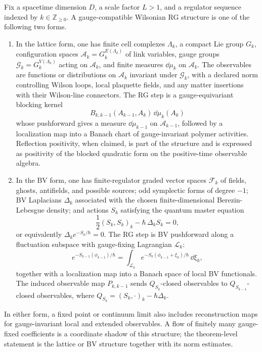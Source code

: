 \begin{definition}
\label{def:gauge-compatible-wilsonian-rg-structure}
Fix a spacetime dimension \(D\), a scale factor \(L>1\), and a regulator
sequence indexed by \(k\in\mathbb Z_{\geq0}\).  A gauge-compatible Wilsonian
RG structure is one of the following two forms.
\begin{enumerate}
  \item In the lattice form, one has finite cell complexes
  \(\Lambda_k\), a compact Lie group \(G_k\), configuration spaces
  \(\mathcal A_k=G_k^{E(\Lambda_k)}\) of link variables, gauge groups
  \(\mathcal G_k=G_k^{V(\Lambda_k)}\) acting on \(\mathcal A_k\), and finite
  measures \(\dd\mu_k\) on \(\mathcal A_k\).  The observables are functions or
  distributions on \(\mathcal A_k\) invariant under \(\mathcal G_k\), with a
  declared norm controlling Wilson loops, local plaquette fields, and any
  matter insertions with their Wilson-line connectors.  The RG step is a
  gauge-equivariant blocking kernel
  \[
    B_{k,k-1}(A_{k-1},A_k)\,\dd\mu_k(A_k)
  \]
  whose pushforward gives a measure \(\dd\mu_{k-1}\) on
  \(\mathcal A_{k-1}\), followed by a localization map into a Banach chart of
  gauge-invariant polymer activities.  Reflection positivity, when claimed,
  is part of the structure and is expressed as positivity of the blocked
  quadratic form on the positive-time observable algebra.
  \item In the BV form, one has finite-regulator graded vector spaces
  \(\mathcal F_k\) of fields, ghosts, antifields, and possible sources; odd
  symplectic forms of degree \(-1\); BV Laplacians \(\Delta_k\) associated
  with the chosen finite-dimensional Berezin-Lebesgue density; and actions
  \(S_k\) satisfying the quantum master equation
  \begin{equation}
    \frac12(S_k,S_k)_k-\hbar\,\Delta_k S_k=0 ,
    \label{eq:gauge-compatible-qme-at-scale}
  \end{equation}
  or equivalently \(\Delta_k e^{-S_k/\hbar}=0\).  The RG step is BV
  pushforward along a fluctuation subspace with gauge-fixing Lagrangian
  \(\mathcal L_k\):
  \begin{equation}
    e^{-S_{k-1}(\phi_{k-1})/\hbar}
    =
    \int_{\mathcal L_k}
      e^{-S_k(\phi_{k-1}+\xi_k)/\hbar}\,\dd\xi_k ,
    \label{eq:bv-rg-pushforward}
  \end{equation}
  together with a localization map into a Banach space of local BV
  functionals.  The induced observable map
  \(P_{k,k-1}\) sends \(Q_{S_k}\)-closed observables to
  \(Q_{S_{k-1}}\)-closed observables, where
  \(Q_{S_k}=(S_k,\cdot)_k-\hbar\Delta_k\).
\end{enumerate}
In either form, a fixed point or continuum limit also includes reconstruction
maps for gauge-invariant local and extended observables.  A flow of finitely
many gauge-fixed coefficients is a coordinate shadow of this structure; the
theorem-level statement is the lattice or BV structure together with its
norm estimates.
\end{definition}

